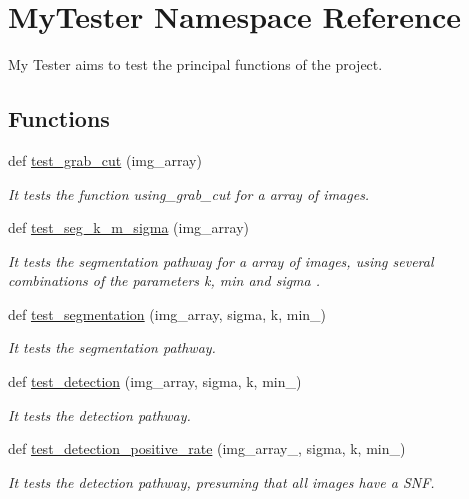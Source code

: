 \hypertarget{namespaceMyTester}{}\section{My\+Tester Namespace Reference}
\label{namespaceMyTester}


My Tester aims to test the principal functions of the project.  


\subsection*{Functions}
\begin{DoxyCompactItemize}
\item 
def \hyperlink{namespaceMyTester_a6cc53fb240261f322f8f2b311d4c8b9d}{test\+\_\+grab\+\_\+cut} (img\+\_\+array)
\begin{DoxyCompactList}\small\item\em It tests the function using\+\_\+grab\+\_\+cut for a array of images. \end{DoxyCompactList}\item 
def \hyperlink{namespaceMyTester_a581b270d248a0cd1d06d9b7b508b1a94}{test\+\_\+seg\+\_\+k\+\_\+m\+\_\+sigma} (img\+\_\+array)
\begin{DoxyCompactList}\small\item\em It tests the segmentation pathway for a array of images, using several combinations of the parameters k, min and sigma . \end{DoxyCompactList}\item 
def \hyperlink{namespaceMyTester_aca4cd4a6cf37238d7d0c60764a2c0d35}{test\+\_\+segmentation} (img\+\_\+array, sigma, k, min\+\_\+)
\begin{DoxyCompactList}\small\item\em It tests the segmentation pathway. \end{DoxyCompactList}\item 
def \hyperlink{namespaceMyTester_ad56fe3114535af39d7584621f94deda5}{test\+\_\+detection} (img\+\_\+array, sigma, k, min\+\_\+)
\begin{DoxyCompactList}\small\item\em It tests the detection pathway. \end{DoxyCompactList}\item 
def \hyperlink{namespaceMyTester_a7676c871b930c3678e168307c05b10ba}{test\+\_\+detection\+\_\+positive\+\_\+rate} (img\+\_\+array\+\_\+, sigma, k, min\+\_\+)
\begin{DoxyCompactList}\small\item\em It tests the detection pathway, presuming that all images have a S\+NF. \end{DoxyCompactList}\item 

\end{DoxyCompactItemize}
